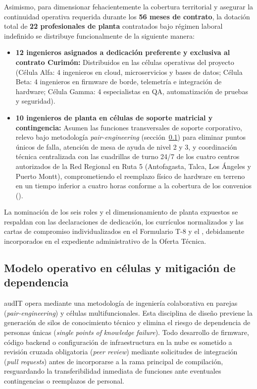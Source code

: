 \noindent Asimismo, para dimensionar fehacientemente la cobertura territorial y asegurar la continuidad operativa requerida durante los \textbf{56 meses de contrato}, la dotación total de \textbf{22 profesionales de planta} contratados bajo régimen laboral indefinido se distribuye funcionalmente de la siguiente manera:
\begin{itemize}
  \item \textbf{12 ingenieros asignados a dedicación preferente y exclusiva al contrato Curimón:} Distribuidos en las células operativas del proyecto (Célula Alfa: 4 ingenieros en cloud, microservicios y bases de datos; Célula Beta: 4 ingenieros en firmware de borde, telemetría e integración de hardware; Célula Gamma: 4 especialistas en QA, automatización de pruebas y seguridad).
  \item \textbf{10 ingenieros de planta en células de soporte matricial y contingencia:} Asumen las funciones transversales de soporte corporativo, relevo bajo metodología \textit{pair-engineering} (sección~\ref{sec:1-celulas}) para eliminar puntos únicos de falla, atención de mesa de ayuda de nivel 2 y 3, y coordinación técnica centralizada con las cuadrillas de turno 24/7 de los cuatro centros autorizados de la Red Regional en Ruta 5 (Antofagasta, Talca, Los Ángeles y Puerto Montt), comprometiendo el reemplazo físico de hardware en terreno en un tiempo inferior a cuatro horas conforme a la cobertura de los convenios ().
\end{itemize}
La nominación de los seis roles y el dimensionamiento de planta expuestos se respaldan con las declaraciones de dedicación, los currículos normalizados y las cartas de compromiso individualizados en el Formulario T-8 y el , debidamente incorporados en el expediente administrativo de la Oferta Técnica.

\subsection{Modelo operativo en células y mitigación de dependencia}\label{sec:1-celulas}

audIT opera mediante una metodología de ingeniería colaborativa en parejas (\textit{pair\allowbreak-engineering}) y células multifuncionales. Esta disciplina de diseño previene la generación de silos de conocimiento técnico y elimina el riesgo de dependencia de personas únicas (\textit{single} \textit{points} \textit{of} \textit{knowledge} \textit{failure}). Todo desarrollo de firmware, código backend o configuración de infraestructura en la nube es sometido a revisión cruzada obligatoria (\textit{peer review}) mediante solicitudes de integración (\textit{pull requests}) antes de incorporarse a la rama principal de compilación, resguardando la transferibilidad inmediata de funciones ante eventuales contingencias o reemplazos de personal.

